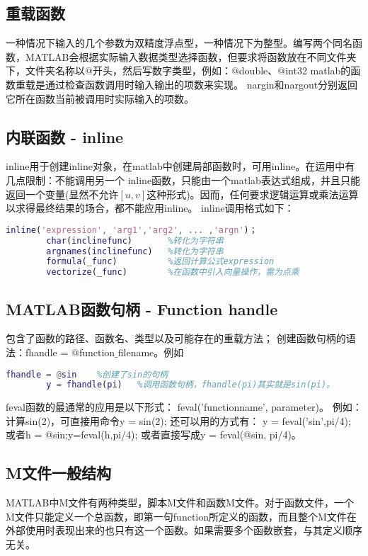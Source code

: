     \subsection{重载函数}
        一种情况下输入的几个参数为双精度浮点型，一种情况下为整型。编写两个同名函数，MATLAB会根据实际输入数据类型选择函数，但要求将函数放在不同文件夹下，文件夹名称以$@$开头，然后写数字类型，例如：$@$double、$@$int32
        matlab的函数重载是通过检查函数调用时输入输出的项数来实现。
        nargin和nargout分别返回它所在函数当前被调用时实际输入的项数。
    \subsection{内联函数 - inline}
        inline用于创建inline对象，在matlab中创建局部函数时，可用inline。在运用中有几点限制：不能调用另一个 inline函数，只能由一个matlab表达式组成，并且只能返回一个变量(显然不允许$[u,v]$这种形式)。因而，任何要求逻辑运算或乘法运算以求得最终结果的场合，都不能应用inline。
        inline调用格式如下：
        \begin{lstlisting}[language=Matlab]
        inline('expression', 'arg1','arg2', ... ,'argn')；
        char(inclinefunc)       %转化为字符串
        argnames(inclinefunc)   %转化为字符串
        formula(_func)          %返回计算公式expression
        vectorize(_func)        %在函数中引入向量操作，需为点乘
        \end{lstlisting}
    \subsection{MATLAB函数句柄 - Function handle }
        包含了函数的路径、函数名、类型以及可能存在的重载方法；
        创建函数句柄的语法：fhandle = $@$function$\_$filename。例如
        \begin{lstlisting}[language=Matlab]
        fhandle = @sin    %创建了sin的句柄
        y = fhandle(pi)   %调用函数句柄，fhandle(pi)其实就是sin(pi)。
        \end{lstlisting}
        \par
        feval函数的最通常的应用是以下形式：
        feval('functionname', parameter)。
        例如：计算sin(2)，可直接用命令y = sin(2);
        还可以用的方式有：
        y = feval('sin',pi/4); 或者h = @sin;y=feval(h,pi/4); 或者直接写成y = feval(@sin, pi/4)。

    \subsection{M文件一般结构}
        MATLAB中M文件有两种类型，脚本M文件和函数M文件。对于函数文件，一个M文件只能定义一个总函数，即第一句function所定义的函数，而且整个M文件在外部使用时表现出来的也只有这一个函数。如果需要多个函数嵌套，与其定义顺序无关。
